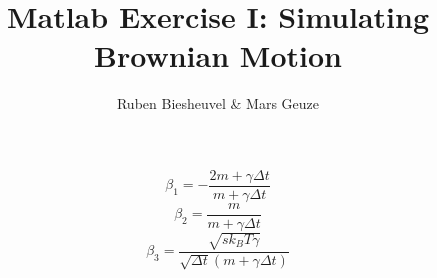 \documentclass[12pt]{article}
\begin{document}
	\title{Matlab Exercise I: Simulating Brownian Motion}
	\author{Ruben Biesheuvel \& Mars Geuze}
	\maketitle


\section{}
\begin{equation}
	\beta_1 = -\frac{2m + \gamma\Delta t}{m+\gamma\Delta t}
\end{equation}
\begin{equation}
	\beta_2 = \frac{m}{m+\gamma\Delta t}
\end{equation}
\begin{equation}
	\beta_3 = \frac{\sqrt{sk_BT\gamma}}{\sqrt{\Delta t}(m+\gamma\Delta t)}
\end{equation}

\section{}
\end{document}
